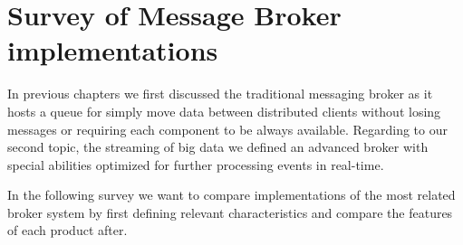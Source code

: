 \chapter{Survey of Message Broker implementations} 
\label{survey-broker}
In previous chapters we first discussed the traditional messaging broker as it hosts a queue
for simply move data between distributed clients without losing messages or
requiring each component to be always available. Regarding to our second topic,
the streaming of big data we defined an advanced broker with special abilities
optimized for further processing events in real-time. 

In the following survey we want to compare implementations of the most related
broker system by first defining relevant characteristics and compare the
features of each product after.

